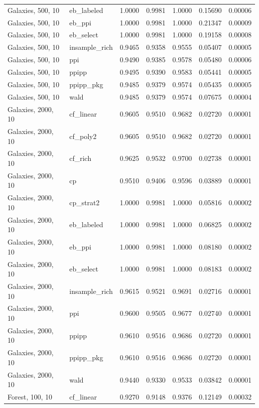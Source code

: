 \begin{longtable}{llrrrrr}
Galaxies, 500, 10 & eb\_labeled & 1.0000 & 0.9981 & 1.0000 & 0.15690 & 0.00006 \\
Galaxies, 500, 10 & eb\_ppi & 1.0000 & 0.9981 & 1.0000 & 0.21347 & 0.00009 \\
Galaxies, 500, 10 & eb\_select & 1.0000 & 0.9981 & 1.0000 & 0.19158 & 0.00008 \\
Galaxies, 500, 10 & insample\_rich & 0.9465 & 0.9358 & 0.9555 & 0.05407 & 0.00005 \\
Galaxies, 500, 10 & ppi & 0.9490 & 0.9385 & 0.9578 & 0.05480 & 0.00006 \\
Galaxies, 500, 10 & ppipp & 0.9495 & 0.9390 & 0.9583 & 0.05441 & 0.00005 \\
Galaxies, 500, 10 & ppipp\_pkg & 0.9485 & 0.9379 & 0.9574 & 0.05435 & 0.00005 \\
Galaxies, 500, 10 & wald & 0.9485 & 0.9379 & 0.9574 & 0.07675 & 0.00004 \\
Galaxies, 2000, 10 & cf\_linear & 0.9605 & 0.9510 & 0.9682 & 0.02720 & 0.00001 \\
Galaxies, 2000, 10 & cf\_poly2 & 0.9605 & 0.9510 & 0.9682 & 0.02720 & 0.00001 \\
Galaxies, 2000, 10 & cf\_rich & 0.9625 & 0.9532 & 0.9700 & 0.02738 & 0.00001 \\
Galaxies, 2000, 10 & cp & 0.9510 & 0.9406 & 0.9596 & 0.03889 & 0.00001 \\
Galaxies, 2000, 10 & cp\_strat2 & 1.0000 & 0.9981 & 1.0000 & 0.05816 & 0.00002 \\
Galaxies, 2000, 10 & eb\_labeled & 1.0000 & 0.9981 & 1.0000 & 0.06825 & 0.00002 \\
Galaxies, 2000, 10 & eb\_ppi & 1.0000 & 0.9981 & 1.0000 & 0.08180 & 0.00002 \\
Galaxies, 2000, 10 & eb\_select & 1.0000 & 0.9981 & 1.0000 & 0.08183 & 0.00002 \\
Galaxies, 2000, 10 & insample\_rich & 0.9615 & 0.9521 & 0.9691 & 0.02716 & 0.00001 \\
Galaxies, 2000, 10 & ppi & 0.9600 & 0.9505 & 0.9677 & 0.02740 & 0.00001 \\
Galaxies, 2000, 10 & ppipp & 0.9610 & 0.9516 & 0.9686 & 0.02720 & 0.00001 \\
Galaxies, 2000, 10 & ppipp\_pkg & 0.9610 & 0.9516 & 0.9686 & 0.02720 & 0.00001 \\
Galaxies, 2000, 10 & wald & 0.9440 & 0.9330 & 0.9533 & 0.03842 & 0.00001 \\
Forest, 100, 10 & cf\_linear & 0.9270 & 0.9148 & 0.9376 & 0.12149 & 0.00032 \\

\end{longtable}
